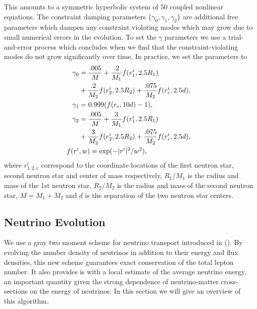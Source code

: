 %
%
%
This amounts to a symmetric hyperbolic system of 50 coupled nonlinear equations. The constraint damping parameters $\{\gamma_0,\gamma_1,\gamma_2\}$ are additional free parameters which dampen any constraint violating modes which may grow due to small numerical errors in the evolution. To set the $\gamma$ parameters we use a trial-and-error process which concludes when we find that the constraint-violating modes do not grow significantly over time. In practice, we set the parameters to
%
\begin{align}
\gamma_0 &= \frac{.005}{M}+\frac{.2}{M_1}f(r^i_1, 2.5R_1)\notag\\
&+\frac{.2}{M_2}f(r^i_2, 2.5R_2)+\frac{.075}{M_2}f(r^i_c, 2.5d), \\
\gamma_1 &= 0.999 (f(r_c, 10d) - 1), \\
\gamma_2 &= \frac{.005}{M}+\frac{3}{M_1}f(r^i_1, 2.5R_1)\notag\\
&+\frac{3}{M_2}f(r^i_2, 2.5R_2)+\frac{.075}{M_2}f(r^i_c, 2.5d), \\
f(r^i&,w) = \exp(-|r^i|^2/w^2),
\end{align}
where $r^i_{1,2,c}$ correspond to the coordinate locations of the first neutron star, second neutron star and center of mass respectively, $R_1/M_1$ is the radius and mass of the 1st neutron star, $R_2/M_2$ is the radius and mass of the second neutron star, $M = M_1 + M_2$ and $d$ is the separation of the two neutron star centers.

\subsection{Neutrino Evolution}

We use a gray two moment scheme for neutrino transport introduced in (\citet*{foucart2016impact}). By evolving the number density of neutrinos in addition to their energy and flux densities, this new scheme guarantees exact conservation of the total lepton number. It also provides is with a local estimate of the average neutrino energy, an important quantity given the strong dependence of neutrino-matter cross-sections on the energy of neutrinos. In this section we will give an overview of this algorithm.

